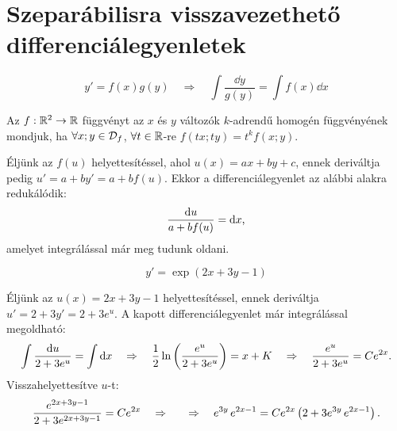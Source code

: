 \clearpage
\section{Szeparábilisra visszavezethető differenciálegyenletek}

\begin{definition}
  $$
    y' = f(x)g(y)
    \quad \Rightarrow \quad
    \int \frac{\dd y}{g(y)} = \int f(x) \dd x
  $$
\end{definition}

\begin{definition}
  Az $f : \mathbb{R}^2 \rightarrow \mathbb{R}$ függvényt az $x$ és $y$ változók
  $k$-adrendű homogén függvényének mondjuk, ha $\forall x;y \in \mathcal{D}_f$,
  $\forall t \in \mathbb{R}$-re $f \left( tx; ty \right) = t^k f(x; y)$.
\end{definition}

\begin{blueBox}[$y' = f(ax + by + c)$ típusú differenciálegyenlet megoldása]
  Éljünk az $f(u)$ helyettesítéssel, ahol $u(x) = ax + by + c$, ennek deriváltja
  pedig $u' = a + b y' = a + b f(u)$. Ekkor a differenciálegyenlet az alábbi
  alakra redukálódik:
  $$
    \frac{\mathop{}\!\mathrm{d} u}{a + b f(u)} = \mathop{}\!\mathrm{d} x
    \text,
  $$
  amelyet integrálással már meg tudunk oldani.
\end{blueBox}

\begin{example}
  $$
    y' = \exp(2x + 3y - 1)
  $$
  \boxrule

  Éljünk az $u(x) = 2x + 3y - 1$ helyettesítéssel, ennek deriváltja
  $u' = 2 + 3y' = 2 + 3e^u$. A kapott differenciálegyenlet már integrálással
  megoldható:
  $$
    \int\frac{\mathop{}\!\mathrm{d} u}{2 + 3e^u} = \int\mathop{}\!\mathrm{d} x
    \quad\Rightarrow\quad
    \frac{1}{2} \ln \left( \frac{e^u}{2 + 3e^u} \right) = x + K
    \quad\Rightarrow\quad
    \frac{e^u}{2 + 3e^u} = C e^{2x}
    \text.
  $$
  Visszahelyettesítve $u$-t:
  $$
    \frac{e^{2x + 3y - 1}}{2 + 3e^{2x + 3y - 1}} = C e^{2x}
    \quad\Rightarrow\quad
    \quad\Rightarrow\quad
    e^{3y} \, e^{2x - 1} = C e^{2x} \left( 2 + 3e^{3y} \, e^{2x - 1} \right)
    \text.
  $$
\end{example}